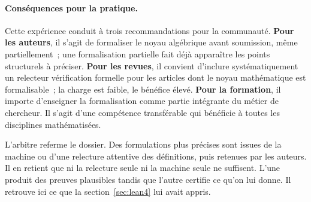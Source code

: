 \begin{sloppypar}
\paragraph{Cons\'equences pour la pratique.}
Cette exp\'erience conduit \`a trois recommandations pour la communaut\'e.
\textbf{Pour les auteurs}, il s'agit de formaliser le noyau alg\'ebrique avant
soumission, m\^eme partiellement~; une formalisation partielle fait d\'ej\`a
appara\^itre les points structurels \`a pr\'eciser. \textbf{Pour les revues}, il
convient d'inclure syst\'ematiquement un relecteur \og v\'erification formelle \fg{}
pour les articles dont le noyau math\'ematique est formalisable~; la charge est
faible, le b\'en\'efice \'elev\'e. \textbf{Pour la formation}, il importe d'enseigner
la formalisation comme partie int\'egrante du m\'etier de chercheur. Il s'agit
d'une comp\'etence transf\'erable qui b\'en\'eficie \`a toutes les disciplines
math\'ematis\'ees.

\begin{boiteArbitre}
L'arbitre referme le dossier. Des formulations plus pr\'ecises sont issues de la
machine ou d'une relecture attentive des d\'efinitions, puis retenues par les
auteurs. Il en retient que ni la relecture seule ni la machine seule ne
suffisent. L'une produit des preuves plausibles tandis que l'autre certifie
ce qu'on lui donne. Il retrouve ici ce que la section~\ref{sec:lean4} lui avait appris.
\end{boiteArbitre}

\end{sloppypar}

